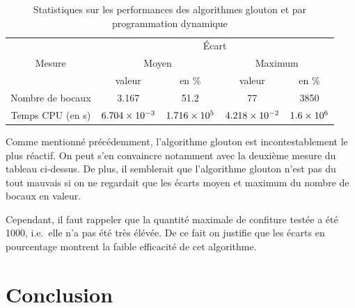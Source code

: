 \documentclass[12pt,a4paper]{article}
\begin{document}
 \begin{table}
    \begin{tabular}{|c|cc|cc|}
	\hline \multirow{3}{*}{Mesure} & \multicolumn{4}{c|}{\'Ecart} \\ 
    \cline{2-5} & \multicolumn{2}{c}{Moyen} & \multicolumn{2}{c|}{Maximum} \\ 
	\cline{2-5} &  valeur & en \% & valeur & en \% \\ 
    \hline \color{red} Nombre de bocaux & 3.167 & 51.2 & 77 & 3850 \\ 
	\hline \color{blue} Temps CPU (en \si{s}) & $\num{6.704E-03}$ & $\num{1.716E+05}$ & $\num{4.218E-02}$ & $\num{1.6E+06}$ \\ 
	\hline
	\end{tabular}
	\caption[Performance compar\'ee de l'algorithme glouton]{Statistiques sur les performances des algorithmes glouton et par programmation dynamique}
  \label{tab:stats}
\end{table}

Comme mentionn\'e pr\'ec\'edemment, l'algorithme glouton est incontestablement le plus r\'eactif. On peut s'en convaincre notamment avec la deuxi\`eme mesure du tableau ci-dessus. De plus, il semblerait que l'algorithme glouton n'est pas du tout mauvais si on ne regardait que les \'ecarts moyen et maximum du nombre de bocaux en valeur. 

Cependant, il faut rappeler que la quantit\'e maximale de confiture test\'ee a \'et\'e 1000, i.e.\ elle n'a pas \'et\'e tr\`es \'el\'ev\'ee. De ce fait on justifie que les \'ecarts en pourcentage montrent la faible efficacit\'e de cet algorithme.

 
\newpage

\part*{Conclusion}

\end{document}

